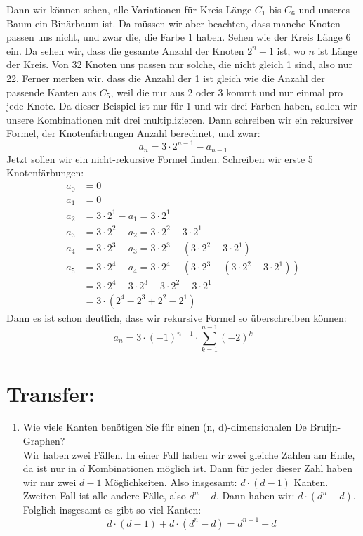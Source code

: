         Dann wir können sehen, alle Variationen für Kreis Länge $C_1$ bis $C_6$ und unseres Baum ein 
        Binärbaum ist. Da müssen wir aber beachten, dass manche Knoten passen uns nicht, und zwar die, 
        die Farbe 1 haben. Sehen wie der Kreis Länge 6 ein. Da sehen wir, dass die gesamte Anzahl der 
        Knoten $2^n-1$ ist, wo $n$ ist Länge der Kreis. Von 32 Knoten uns passen nur solche, die nicht 
        gleich 1 sind, also nur 22. Ferner merken wir, dass die Anzahl der 1 ist gleich wie die Anzahl 
        der passende Kanten aus $C_5$, weil die nur aus 2 oder 3 kommt und nur einmal pro jede Knote. 
        Da dieser Beispiel ist nur für 1 und wir drei Farben haben, sollen wir unsere Kombinationen 
        mit drei multiplizieren. Dann schreiben wir ein rekursiver Formel, der Knotenfärbungen Anzahl 
        berechnet, und zwar: $$ a_n = 3\cdot 2^{n-1} - a_{n-1} $$
        Jetzt sollen wir ein nicht-rekursive Formel finden. Schreiben wir erste 5 Knotenfärbungen:
        \begin{align*}
            a_0 &= 0\\
            a_1 &= 0\\
            a_2 &= 3\cdot 2^1 - a_1 = 3\cdot 2^1\\
            a_3 &= 3\cdot 2^2 - a_2 = 3\cdot 2^2 - 3\cdot 2^1\\
            a_4 &= 3\cdot 2^3 - a_3 = 3\cdot 2^3 - (3\cdot 2^2 - 3\cdot 2^1)\\
            a_5 &= 3\cdot 2^4 - a_4 = 3\cdot 2^4 - (3\cdot 2^3 - (3\cdot 2^2 - 3\cdot 2^1))\\
            &= 3\cdot 2^4 - 3\cdot 2^3 + 3\cdot 2^2 - 3\cdot 2^1\\
            &= 3\cdot (2^4 - 2^3 + 2^2 - 2^1)
        \end{align*} 
        Dann es ist schon deutlich, dass wir rekursive Formel so überschreiben können:
        $$ a_n = 3 \cdot (-1)^{n-1} \cdot \sum_{k=1}^{n-1}(-2)^k$$
    \section*{Transfer:}
    \begin{enumerate}[label=(\alph*)]
    	\item Wie viele Kanten benötigen Sie für einen (n, d)-dimensionalen De Bruijn-Graphen?\\
        Wir haben zwei Fällen. In einer Fall haben wir zwei gleiche Zahlen am Ende, da ist nur in $d$ 
        Kombinationen möglich ist. Dann für jeder dieser Zahl haben wir nur zwei $d-1$ Möglichkeiten. 
        Also insgesamt: $d\cdot(d-1)$ Kanten. Zweiten Fall ist alle andere Fälle, also $d^n-d$. Dann haben
        wir: $d\cdot(d^n-d)$. Folglich insgesamt es gibt so viel Kanten:
        $$d\cdot(d-1) + d\cdot(d^n-d) = d^{n+1}-d$$
    \end{enumerate}
